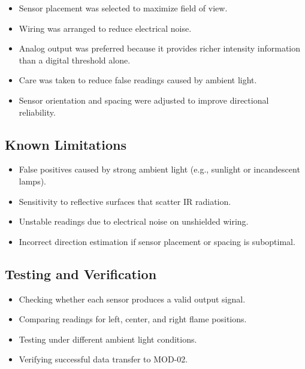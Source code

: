 \documentclass[12pt,a4paper]{article}
\begin{document}
\begin{itemize}[leftmargin=1.5em]
  \item Sensor placement was selected to maximize field of view.
  \item Wiring was arranged to reduce electrical noise.
  \item Analog output was preferred because it provides richer intensity information than a digital threshold alone.
  \item Care was taken to reduce false readings caused by ambient light.
  \item Sensor orientation and spacing were adjusted to improve directional reliability.
\end{itemize}

\subsection{Known Limitations}

\begin{itemize}[leftmargin=1.5em]
  \item False positives caused by strong ambient light (e.g., sunlight or incandescent lamps).
  \item Sensitivity to reflective surfaces that scatter IR radiation.
  \item Unstable readings due to electrical noise on unshielded wiring.
  \item Incorrect direction estimation if sensor placement or spacing is suboptimal.
\end{itemize}

\subsection{Testing and Verification}

\begin{itemize}[leftmargin=1.5em]
  \item Checking whether each sensor produces a valid output signal.
  \item Comparing readings for left, center, and right flame positions.
  \item Testing under different ambient light conditions.
  \item Verifying successful data transfer to MOD-02.
\end{itemize}

\newpage

\end{document}
